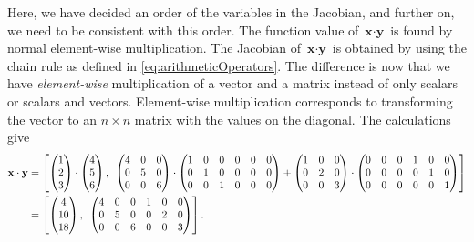 Here, we have decided an order of the variables in the Jacobian, and further on, we need to be consistent with this order. The function value of $\textbf{x}\cdot\textbf{y}$ is found by normal element-wise multiplication. The Jacobian of $\textbf{x}\cdot\textbf{y}$ is obtained by using the chain rule as defined in \eqref{eq:arithmeticOperators}. The difference is now that we have \emph{element-wise} multiplication of a vector and a matrix instead of only scalars or scalars and vectors. Element-wise multiplication corresponds to transforming the vector to an $n\times n$ matrix with the values on the diagonal. The calculations give
\begin{align*}
    \textbf{x}\cdot\textbf{y} &= \left[\begin{pmatrix}
        1\\2\\3
        \end{pmatrix}
        \cdot
        \begin{pmatrix}
        4\\5\\6
        \end{pmatrix}
    ,\hspace{0.5em}
        \begin{pmatrix}
        4&0&0\\
        0&5&0\\
        0&0&6\end{pmatrix}
        \cdot
        \begin{pmatrix}
        1&0&0&0&0&0\\
        0&1&0&0&0&0\\
        0&0&1&0&0&0
        \end{pmatrix}
        +
        \begin{pmatrix}
        1&0&0\\
        0&2&0\\
        0&0&3
        \end{pmatrix}
        \cdot
        \begin{pmatrix}
        0&0&0&1&0&0\\
        0&0&0&0&1&0\\
        0&0&0&0&0&1
        \end{pmatrix}\right]
        \\
        &= \left[
        \begin{pmatrix}
        4\\10\\18
        \end{pmatrix}
        ,\hspace{0.5em}
        \begin{pmatrix}
        4&0&0&1&0&0\\
        0&5&0&0&2&0\\
        0&0&6&0&0&3
        \end{pmatrix}
        \right].
\end{align*}
